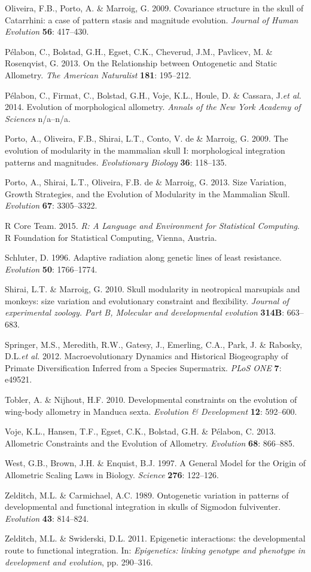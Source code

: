 \documentclass[12pt,]{article}
\begin{document}
Oliveira, F.B., Porto, A. \& Marroig, G. 2009. Covariance structure in
the skull of Catarrhini: a case of pattern stasis and magnitude
evolution. \emph{Journal of Human Evolution} \textbf{56}: 417--430.

Pélabon, C., Bolstad, G.H., Egset, C.K., Cheverud, J.M., Pavlicev, M. \&
Rosenqvist, G. 2013. On the Relationship between Ontogenetic and Static
Allometry. \emph{The American Naturalist} \textbf{181}: 195--212.

Pélabon, C., Firmat, C., Bolstad, G.H., Voje, K.L., Houle, D. \&
Cassara, J.\emph{et al.} 2014. Evolution of morphological allometry.
\emph{Annals of the New York Academy of Sciences} n/a--n/a.

Porto, A., Oliveira, F.B., Shirai, L.T., Conto, V. de \& Marroig, G.
2009. The evolution of modularity in the mammalian skull I:
morphological integration patterns and magnitudes. \emph{Evolutionary
Biology} \textbf{36}: 118--135.

Porto, A., Shirai, L.T., Oliveira, F.B. de \& Marroig, G. 2013. Size
Variation, Growth Strategies, and the Evolution of Modularity in the
Mammalian Skull. \emph{Evolution} \textbf{67}: 3305--3322.

R Core Team. 2015. \emph{R: A Language and Environment for Statistical
Computing}. R Foundation for Statistical Computing, Vienna, Austria.

Schluter, D. 1996. Adaptive radiation along genetic lines of least
resistance. \emph{Evolution} \textbf{50}: 1766--1774.

Shirai, L.T. \& Marroig, G. 2010. Skull modularity in neotropical
marsupials and monkeys: size variation and evolutionary constraint and
flexibility. \emph{Journal of experimental zoology. Part B, Molecular
and developmental evolution} \textbf{314B}: 663--683.

Springer, M.S., Meredith, R.W., Gatesy, J., Emerling, C.A., Park, J. \&
Rabosky, D.L.\emph{et al.} 2012. Macroevolutionary Dynamics and
Historical Biogeography of Primate Diversification Inferred from a
Species Supermatrix. \emph{PLoS ONE} \textbf{7}: e49521.

Tobler, A. \& Nijhout, H.F. 2010. Developmental constraints on the
evolution of wing-body allometry in Manduca sexta. \emph{Evolution \&
Development} \textbf{12}: 592--600.

Voje, K.L., Hansen, T.F., Egset, C.K., Bolstad, G.H. \& Pélabon, C.
2013. Allometric Constraints and the Evolution of Allometry.
\emph{Evolution} \textbf{68}: 866--885.

West, G.B., Brown, J.H. \& Enquist, B.J. 1997. A General Model for the
Origin of Allometric Scaling Laws in Biology. \emph{Science}
\textbf{276}: 122--126.

Zelditch, M.L. \& Carmichael, A.C. 1989. Ontogenetic variation in
patterns of developmental and functional integration in skulls of
Sigmodon fulviventer. \emph{Evolution} \textbf{43}: 814--824.

Zelditch, M.L. \& Swiderski, D.L. 2011. Epigenetic interactions: the
developmental route to functional integration. In: \emph{Epigenetics:
linking genotype and phenotype in development and evolution}, pp.
290--316.
\end{document}
